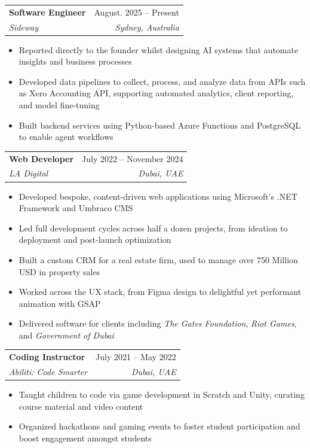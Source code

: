 \documentclass[letterpaper,11pt]{article}
\makeatletter
\newcommand{\resumeItem}[1]{
  \item\small{
    {#1 \vspace{-2pt}}
  }
}
\newcommand{\resumeSubheading}[4]{
  \vspace{-2pt}\item
    \begin{tabular*}{0.97\textwidth}[t]{l@{\extracolsep{\fill}}r}
      \textbf{#1} & #2 \\
      \textit{\small#3} & \textit{\small #4} \\
    \end{tabular*}\vspace{-7pt}
}
\newcommand{\resumeSubSubheading}[2]{
    \item
    \begin{tabular*}{0.97\textwidth}{l@{\extracolsep{\fill}}r}
      \textit{\small#1} & \textit{\small #2} \\
    \end{tabular*}\vspace{-7pt}
}
\newcommand{\resumeSubHeadingListEnd}{\end{itemize}}
\newcommand{\resumeItemListStart}{\begin{itemize}}
\newcommand{\resumeItemListEnd}{\end{itemize}\vspace{-5pt}}
\makeatother
\begin{document}
    \resumeSubheading
      {Software Engineer}{August. 2025 -- Present}
      {Sideway}{Sydney, Australia}
      \resumeItemListStart
        \resumeItem{Reported directly to the founder whilst designing AI systems that automate insights and business processes}
        \resumeItem{Developed data pipelines to collect, process, and analyze data from APIs such as Xero Accounting API, supporting automated analytics, client reporting, and model fine-tuning}
        \resumeItem{Built backend services using Python-based Azure Functions and PostgreSQL to enable agent workflows}
      \resumeItemListEnd

    \resumeSubheading
      {Web Developer}{July 2022 -- November 2024}
      {LA Digital}{Dubai, UAE}
      \resumeItemListStart
        \resumeItem{Developed bespoke, content-driven web applications using Microsoft’s .NET Framework and Umbraco CMS}
        \resumeItem{Led full development cycles across half a dozen projects, from ideation to deployment and post-launch optimization}
        \resumeItem{Built a custom CRM for a real estate firm, used to manage over 750 Million USD in property sales}
        \resumeItem{Worked across the UX stack, from Figma design to delightful yet performant animation with GSAP}
        \resumeItem{Delivered software for clients including \emph{The Gates Foundation}, \emph{Riot Games}, and \emph{Government of Dubai}}
      \resumeItemListEnd



    \resumeSubheading
      {Coding Instructor}{July 2021 -- May 2022}
      {Abiliti: Code Smarter}{Dubai, UAE}
      \resumeItemListStart
        \resumeItem{Taught children to code via game development in Scratch and Unity, curating course material and video content}
        \resumeItem{Organized hackathons and gaming events to foster student participation and boost engagement amongst students}
      \resumeItemListEnd

\end{document}
